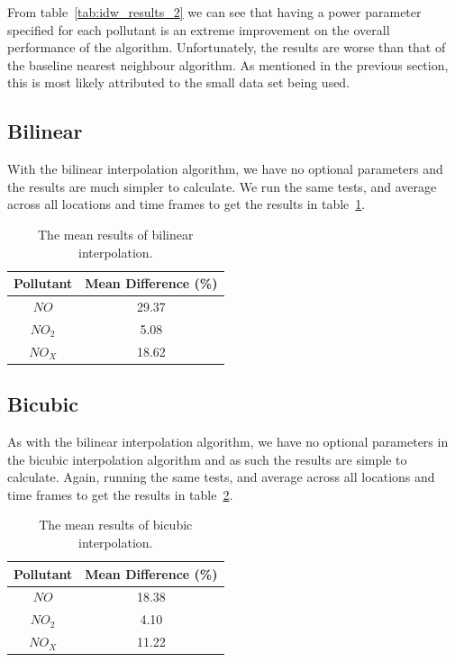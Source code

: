 			From table~\ref{tab:idw_results_2} we can see that having a power parameter specified for each pollutant is an extreme improvement on the overall performance of the algorithm. Unfortunately, the results are worse than that of the baseline nearest neighbour algorithm. As mentioned in the previous section, this is most likely attributed to the small data set being used. 



        \subsection{Bilinear}\label{prediction_evaluation_results_bilinear}

        	With the bilinear interpolation algorithm, we have no optional parameters and the results are much simpler to calculate. We run the same tests, and average across all locations and time frames to get the results in table~\ref{tab:bilinear_results}.

        	\begin{table}[H]
				\centering
	    		\begin{tabular}{|c|c|}
	    			\hline
					Pollutant & Mean Difference (\%) \\ \hline
					$NO$ & 29.37 \\
					$NO_{2}$ & 5.08 \\
					$NO_{X}$ & 18.62 \\
					\hline
				\end{tabular}
				\caption{The mean results of bilinear interpolation.}
				\label{tab:bilinear_results}
			\end{table} 


        \subsection{Bicubic}\label{prediction_evaluation_results_bicubic}

			As with the bilinear interpolation algorithm, we have no optional parameters in the bicubic interpolation algorithm and as such the results are simple to calculate. Again, running the same tests, and average across all locations and time frames to get the results in table~\ref{tab:bicubic_results}.

        	\begin{table}[H]
				\centering
	    		\begin{tabular}{|c|c|}
	    			\hline
					Pollutant & Mean Difference (\%) \\ \hline
					$NO$ & 18.38 \\
					$NO_{2}$ & 4.10 \\
					$NO_{X}$ & 11.22 \\
					\hline
				\end{tabular}
				\caption{The mean results of bicubic interpolation.}
				\label{tab:bicubic_results}
			\end{table} 

